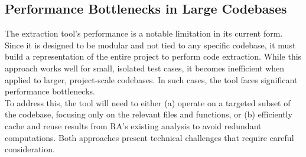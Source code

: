 \subsection*{Performance Bottlenecks in Large Codebases}

The extraction tool's performance is a notable limitation in its current form.
Since it is designed to be modular and not tied to any specific codebase, it
must build a representation of the entire project to perform code extraction.
While this approach works well for small, isolated test cases, it becomes
inefficient when applied to larger, project-scale codebases. In such cases, the
tool faces significant performance bottlenecks. \\
To address this, the tool will need to either (a) operate on a targeted subset
of the codebase, focusing only on the relevant files and functions, or (b)
efficiently cache and reuse results from RA's existing analysis
to avoid redundant computations. Both approaches present technical challenges
that require careful consideration.